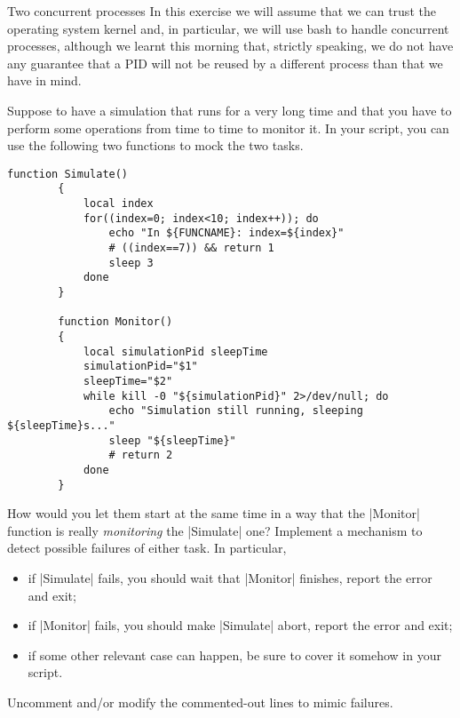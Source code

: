 
\begin{exercise}[Inspirational]{Two concurrent processes}
    In this exercise we will assume that we can trust the operating system kernel and, in particular, we will use bash to handle concurrent processes, although we learnt this morning that, strictly speaking, we do not have any guarantee that a PID will not be reused by a different process than that we have in mind.
    
    Suppose to have a simulation that runs for a very long time and that you have to perform some operations from time to time to monitor it.
    In your script, you can use the following two functions to mock the two tasks.
    \begin{lstlisting}[style=myBash, numbers=none]
        function Simulate()
        {
            local index
            for((index=0; index<10; index++)); do
                echo "In ${FUNCNAME}: index=${index}"
                # ((index==7)) && return 1
                sleep 3
            done
        }

        function Monitor()
        {
            local simulationPid sleepTime
            simulationPid="$1"
            sleepTime="$2"
            while kill -0 "${simulationPid}" 2>/dev/null; do
                echo "Simulation still running, sleeping ${sleepTime}s..."
                sleep "${sleepTime}"
                # return 2
            done
        }
    \end{lstlisting}
    How would you let them start at the same time in a way that the \bash|Monitor| function is really \emph{monitoring} the \bash|Simulate| one?
    Implement a mechanism to detect possible failures of either task.
    In particular,
    \begin{itemize}
        \item if \bash|Simulate| fails, you should wait that \bash|Monitor| finishes, report the error and exit;
        \item if \bash|Monitor| fails, you should make \bash|Simulate| abort, report the error and exit;
        \item if some other relevant case can happen, be sure to cover it somehow in your script.
    \end{itemize}
    Uncomment and/or modify the commented-out lines to mimic failures.
\end{exercise}